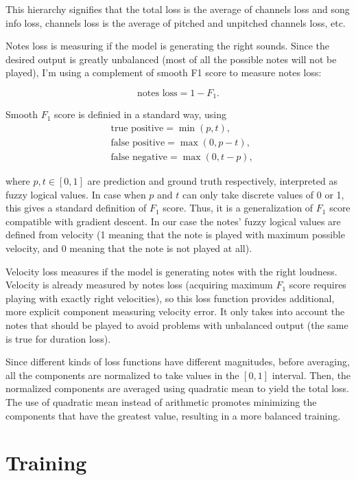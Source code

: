 \documentclass[en]{pracamgr}
\begin{document}
This hierarchy signifies that the total loss is the average of channels loss and song info loss, channels loss is the average of pitched and unpitched channels loss, etc.

Notes loss is measuring if the model is generating the right sounds.
Since the desired output is greatly unbalanced (most of all the possible notes will not be played), I'm using a complement of smooth F1 score to measure notes loss:
\nopagebreak

\begin{equation}
    \textrm{notes loss} = 1 - F_1.
\end{equation}

Smooth $F_1$ score is definied in a standard way, using
\nopagebreak
\begin{align}
    & \textrm{true positive} = \min(p, t), \\
    & \textrm{false positive} = \max(0, p - t), \\
    & \textrm{false negative} = \max(0, t - p),
\end{align}

where $p,t\in[0,1]$ are prediction and ground truth respectively, interpreted as fuzzy logical values.
In case when $p$ and $t$ can only take discrete values of 0 or 1, this gives a standard definition of $F_1$ score.
Thus, it is a generalization of $F_1$ score compatible with gradient descent.
In our case the notes' fuzzy logical values are defined from velocity (1 meaning that the note is played with maximum possible velocity, and 0 meaning that the note is not played at all).

Velocity loss measures if the model is generating notes with the right loudness.
Velocity is already measured by notes loss (acquiring maximum $F_1$ score requires playing with exactly right velocities), so this loss function provides additional, more explicit component measuring velocity error.
It only takes into account the notes that should be played to avoid problems with unbalanced output (the same is true for duration loss).

Since different kinds of loss functions have different magnitudes, before averaging, all the components are normalized to take values in the $[0,1]$ interval.
Then, the normalized components are averaged using quadratic mean to yield the total loss. The use of quadratic mean instead of arithmetic promotes minimizing the components that have the greatest value, resulting in a more balanced training.

\section{Training}
\end{document}
